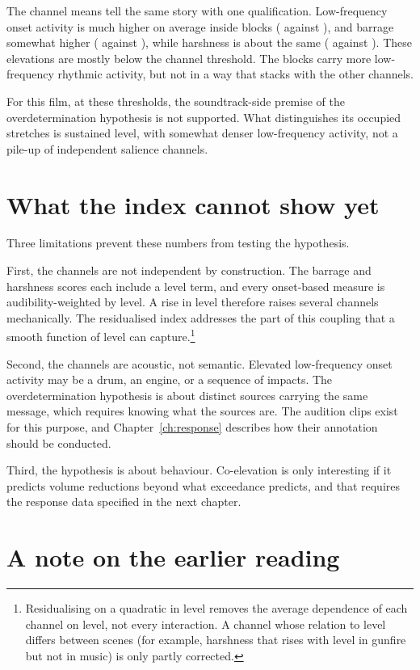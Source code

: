 The channel means tell the same story with one qualification. Low-frequency onset activity is much higher on average inside blocks (\xDrumIn{} against \xDrumOut), and barrage somewhat higher (\xBarrageIn{} against \xBarrageOut), while harshness is about the same (\xHarshIn{} against \xHarshOut). These elevations are mostly below the channel threshold. The blocks carry more low-frequency rhythmic activity, but not in a way that stacks with the other channels.

For this film, at these thresholds, the soundtrack-side premise of the overdetermination hypothesis is not supported. What distinguishes its occupied stretches is sustained level, with somewhat denser low-frequency activity, not a pile-up of independent salience channels.

\section{What the index cannot show yet}

Three limitations prevent these numbers from testing the hypothesis.

First, the channels are not independent by construction. The barrage and harshness scores each include a level term, and every onset-based measure is audibility-weighted by level. A rise in level therefore raises several channels mechanically. The residualised index addresses the part of this coupling that a smooth function of level can capture.\footnote{Residualising on a quadratic in level removes the average dependence of each channel on level, not every interaction. A channel whose relation to level differs between scenes (for example, harshness that rises with level in gunfire but not in music) is only partly corrected.}

Second, the channels are acoustic, not semantic. Elevated low-frequency onset activity may be a drum, an engine, or a sequence of impacts. The overdetermination hypothesis is about distinct sources carrying the same message, which requires knowing what the sources are. The audition clips exist for this purpose, and Chapter~\ref{ch:response} describes how their annotation should be conducted.

Third, the hypothesis is about behaviour. Co-elevation is only interesting if it predicts volume reductions beyond what exceedance predicts, and that requires the response data specified in the next chapter.

\section{A note on the earlier reading}

